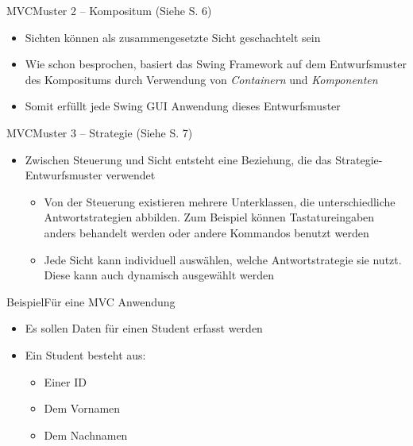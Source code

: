 \begin{frame}{MVC}{Muster 2 -- Kompositum (Siehe \cite{judt2017} S. 6)}  
    \begin{itemize}
        \item Sichten können als zusammengesetzte Sicht geschachtelt sein
        \item Wie schon besprochen, basiert das Swing Framework auf dem Entwurfsmuster des Kompositums durch Verwendung von \textit{Containern} und \textit{Komponenten}
        \item Somit erfüllt jede Swing GUI Anwendung dieses Entwurfsmuster
    \end{itemize}
\end{frame}

\begin{frame}{MVC}{Muster 3 -- Strategie (Siehe \cite{judt2017} S. 7)}
    \begin{itemize}
        \item Zwischen Steuerung und Sicht entsteht eine Beziehung, die das Strategie-Entwurfsmuster verwendet
        \begin{itemize}
            \item Von der Steuerung existieren mehrere Unterklassen, die unterschiedliche Antwortstrategien abbilden. Zum Beispiel können Tastatureingaben anders behandelt werden oder andere Kommandos benutzt werden
            \item Jede Sicht kann individuell auswählen, welche Antwortstrategie sie nutzt. Diese kann auch dynamisch ausgewählt werden
        \end{itemize}
    \end{itemize}
\end{frame}

\begin{frame}{Beispiel}{Für eine MVC Anwendung}
    \begin{itemize}
        \item Es sollen Daten für einen Student erfasst werden
        \item Ein Student besteht aus:
        \begin{itemize}
            \item Einer ID
            \item Dem Vornamen
            \item Dem Nachnamen
        \end{itemize}
    \end{itemize}
\end{frame}

